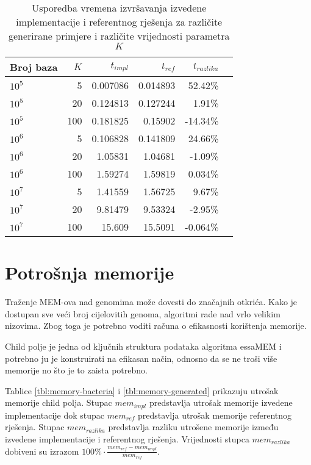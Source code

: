 \documentclass[times, utf8, seminar, numeric]{fer}
\begin{document}
\begin{table}[h]
	\centering
	\caption{Usporedba vremena izvršavanja izvedene implementacije i referentnog rješenja za različite generirane primjere i različite vrijednosti parametra $K$}
	\label{tbl:time-generated}
	
	\begin{tabular}{lrrrrr}
		\hline
        Broj baza & $K$ & $t_{impl}$ & $t_{ref}$ & $t_{razlika}$ \\ \hline
        $10^5$ & 5 & 0.007086 & 0.014893 & 52.42\% \\
        $10^5$ & 20 & 0.124813 & 0.127244 & 1.91\% \\
        $10^5$ & 100 & 0.181825 & 0.15902 & -14.34\% \\ \hline
        $10^6$ & 5 & 0.106828 & 0.141809 & 24.66\% \\
        $10^6$ & 20 & 1.05831 & 1.04681 & -1.09\% \\
        $10^6$ & 100 & 1.59274 & 1.59819 & 0.034\% \\ \hline
        $10^7$ & 5 & 1.41559 & 1.56725 & 9.67\% \\
        $10^7$ & 20 & 9.81479 & 9.53324 & -2.95\% \\
        $10^7$ & 100 & 15.609 & 15.5091 & -0.064\% \\
    \hline
	\end{tabular}
\end{table}

\section{Potrošnja memorije}
\label{sec:mem}

Traženje MEM-ova nad genomima može dovesti do značajnih otkrića. Kako je dostupan sve veći broj cijelovitih genoma, algoritmi rade nad vrlo velikim nizovima. Zbog toga je potrebno voditi računa o efikasnosti korištenja memorije. 

Child polje je jedna od ključnih struktura podataka algoritma essaMEM i potrebno ju je konstruirati na efikasan način, odnosno da se ne troši više memorije no što je to zaista potrebno.

Tablice \ref{tbl:memory-bacteria} i \ref{tbl:memory-generated} prikazuju utrošak memorije child polja. Stupac $mem_{impl}$  predstavlja utrošak memorije izvedene implementacije dok stupac $mem_{ref}$ predstavlja utrošak memorije referentnog rješenja. Stupac $mem_{razlika}$ predstavlja razliku utrošene memorije između izvedene implementacije i referentnog rješenja. Vrijednosti stupca $mem_{razlika}$ dobiveni su izrazom $100\% \cdot \frac{mem_{ref} - mem_{impl}}{mem_{ref}}$.
\end{document}
